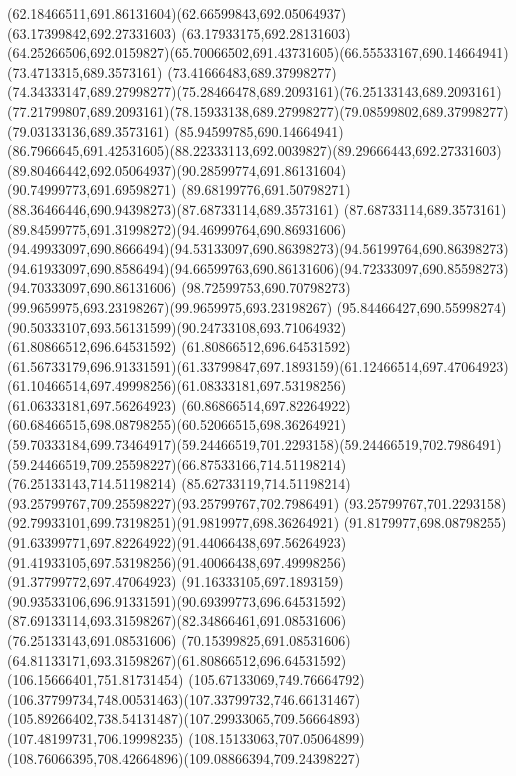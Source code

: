 {{	\curveto(62.18466511,691.86131604)(62.66599843,692.05064937)(63.17399842,692.27331603)
	\lineto(63.17933175,692.28131603)
	\curveto(64.25266506,692.0159827)(65.70066502,691.43731605)(66.55533167,690.14664941)
	\lineto(73.4713315,689.3573161)
	\lineto(73.41666483,689.37998277)
	\curveto(74.34333147,689.27998277)(75.28466478,689.2093161)(76.25133143,689.2093161)
	\curveto(77.21799807,689.2093161)(78.15933138,689.27998277)(79.08599802,689.37998277)
	\lineto(79.03133136,689.3573161)
	\lineto(85.94599785,690.14664941)
	\curveto(86.7966645,691.42531605)(88.22333113,692.0039827)(89.29666443,692.27331603)
	\curveto(89.80466442,692.05064937)(90.28599774,691.86131604)(90.74999773,691.69598271)
	\curveto(89.68199776,691.50798271)(88.36466446,690.94398273)(87.68733114,689.3573161)
	\curveto(87.68733114,689.3573161)(89.84599775,691.31998272)(94.46999764,690.86931606)
	\curveto(94.49933097,690.8666494)(94.53133097,690.86398273)(94.56199764,690.86398273)
	\curveto(94.61933097,690.8586494)(94.66599763,690.86131606)(94.72333097,690.85598273)
	\lineto(94.70333097,690.86131606)
	\curveto(98.72599753,690.70798273)(99.9659975,693.23198267)(99.9659975,693.23198267)
	\curveto(95.84466427,690.55998274)(90.50333107,693.56131599)(90.24733108,693.71064932)
	\moveto(61.80866512,696.64531592)
	\lineto(61.80866512,696.64531592)
	\curveto(61.56733179,696.91331591)(61.33799847,697.1893159)(61.12466514,697.47064923)
	\curveto(61.10466514,697.49998256)(61.08333181,697.53198256)(61.06333181,697.56264923)
	\curveto(60.86866514,697.82264922)(60.68466515,698.08798255)(60.52066515,698.36264921)
	\curveto(59.70333184,699.73464917)(59.24466519,701.2293158)(59.24466519,702.7986491)
	\curveto(59.24466519,709.25598227)(66.87533166,714.51198214)(76.25133143,714.51198214)
	\curveto(85.62733119,714.51198214)(93.25799767,709.25598227)(93.25799767,702.7986491)
	\curveto(93.25799767,701.2293158)(92.79933101,699.73198251)(91.9819977,698.36264921)
	\curveto(91.8179977,698.08798255)(91.63399771,697.82264922)(91.44066438,697.56264923)
	\curveto(91.41933105,697.53198256)(91.40066438,697.49998256)(91.37799772,697.47064923)
	\curveto(91.16333105,697.1893159)(90.93533106,696.91331591)(90.69399773,696.64531592)
	\curveto(87.69133114,693.31598267)(82.34866461,691.08531606)(76.25133143,691.08531606)
	\curveto(70.15399825,691.08531606)(64.81133171,693.31598267)(61.80866512,696.64531592)
	\moveto(106.15666401,751.81731454)
	\curveto(105.67133069,749.76664792)(106.37799734,748.00531463)(107.33799732,746.66131467)
	\curveto(105.89266402,738.54131487)(107.29933065,709.56664893)(107.48199731,706.19998235)
	\curveto(108.15133063,707.05064899)(108.76066395,708.42664896)(109.08866394,709.24398227)
}}
